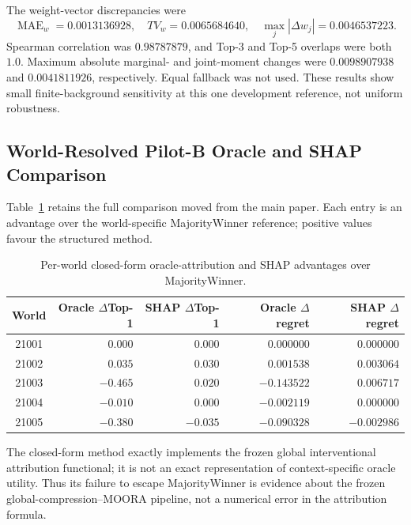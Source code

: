\documentclass[runningheads,orivec]{llncs}
\begin{document}
The weight-vector discrepancies were
\begin{equation}
\operatorname{MAE}_w=0.0013136928,\quad
TV_w=0.0065684640,\quad
\max_j|\Delta w_j|=0.0046537223.
\label{supp:eq:b100distances}
\end{equation}
Spearman correlation was $0.98787879$, and Top-3 and Top-5 overlaps were both $1.0$.
Maximum absolute marginal- and joint-moment changes were $0.0098907938$ and $0.0041811926$,
respectively. Equal fallback was not used. These results show small
finite-background sensitivity at this one development reference, not uniform robustness.

\subsection{World-Resolved Pilot-B Oracle and SHAP Comparison}

Table~\ref{supp:tab:pilotboracleshap} retains the full comparison moved from the main paper.
Each entry is an advantage over the world-specific MajorityWinner reference; positive values
favour the structured method.

\begin{table}[t]
\centering
\caption{Per-world closed-form oracle-attribution and SHAP advantages over MajorityWinner.}
\label{supp:tab:pilotboracleshap}
\small
\begin{tabular}{@{}crrrr@{}}
\toprule
World & Oracle $\Delta$Top-1 & SHAP $\Delta$Top-1 & Oracle $\Delta$regret & SHAP $\Delta$regret\\
\midrule
21001 & $ 0.000$ & $ 0.000$ & $ 0.000000$ & $ 0.000000$\\
21002 & $ 0.035$ & $ 0.030$ & $ 0.001538$ & $ 0.003064$\\
21003 & $-0.465$ & $ 0.020$ & $-0.143522$ & $ 0.006717$\\
21004 & $-0.010$ & $ 0.000$ & $-0.002119$ & $ 0.000000$\\
21005 & $-0.380$ & $-0.035$ & $-0.090328$ & $-0.002986$\\
\bottomrule
\end{tabular}
\end{table}

The closed-form method exactly implements the frozen global interventional attribution
functional; it is not an exact representation of context-specific oracle utility. Thus its
failure to escape MajorityWinner is evidence about the frozen global-compression--MOORA
pipeline, not a numerical error in the attribution formula.
\end{document}
